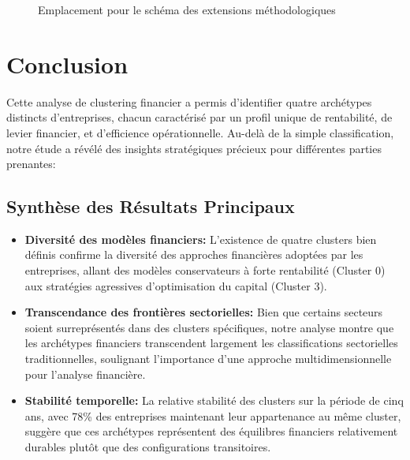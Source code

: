 \documentclass[12pt]{article}
\begin{document}
\begin{figure}[H]
    \centering
    \caption{Emplacement pour le schéma des extensions méthodologiques}
    \label{fig:extensions}
\end{figure}

\section{Conclusion}
Cette analyse de clustering financier a permis d'identifier quatre archétypes distincts d'entreprises, chacun caractérisé par un profil unique de rentabilité, de levier financier, et d'efficience opérationnelle. Au-delà de la simple classification, notre étude a révélé des insights stratégiques précieux pour différentes parties prenantes:

\subsection{Synthèse des Résultats Principaux}
\begin{itemize}
    \item \textbf{Diversité des modèles financiers:} L'existence de quatre clusters bien définis confirme la diversité des approches financières adoptées par les entreprises, allant des modèles conservateurs à forte rentabilité (Cluster 0) aux stratégies agressives d'optimisation du capital (Cluster 3).
    
    \item \textbf{Transcendance des frontières sectorielles:} Bien que certains secteurs soient surreprésentés dans des clusters spécifiques, notre analyse montre que les archétypes financiers transcendent largement les classifications sectorielles traditionnelles, soulignant l'importance d'une approche multidimensionnelle pour l'analyse financière.
    
    \item \textbf{Stabilité temporelle:} La relative stabilité des clusters sur la période de cinq ans, avec 78\% des entreprises maintenant leur appartenance au même cluster, suggère que ces archétypes représentent des équilibres financiers relativement durables plutôt que des configurations transitoires.
\end{itemize}
\end{document}
